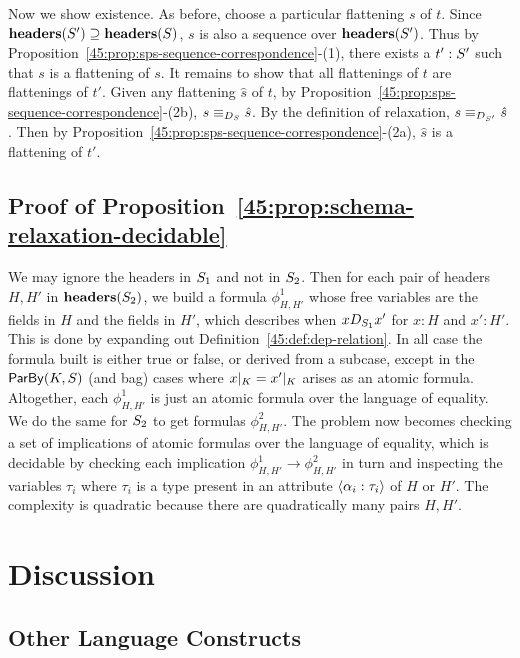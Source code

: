 Now we show existence.
As before, choose a particular flattening $s$ of $t$.
Since $\headers(\ss') \supseteq \headers(\ss)$,
$s$ is also a sequence over $\headers(\ss')$.
Thus by Proposition~\ref{45:prop:sps-sequence-correspondence}-(1),
there exists a $t': \ss'$ such that $s$ is a flattening
of $s$.
It remains to show that all flattenings of $t$ are flattenings of $t'$.
Given any flattening $\hat{s}$ of $t$,
by Proposition~\ref{45:prop:sps-sequence-correspondence}-(2b),
$s \equiv_{D_{\ss}} \hat{s}$.
By the definition of relaxation,
$s \equiv_{D_{\ss'}} \hat{s}$.
Then by Proposition~\ref{45:prop:sps-sequence-correspondence}-(2a),
$\hat{s}$ is a flattening of $t'$.

\subsection*{Proof of Proposition~\ref{45:prop:schema-relaxation-decidable}}

We may ignore the headers in $\ss_1$ and not in $\ss_2$.
Then for each pair of headers $H, H'$ in $\headers(\ss_2)$,
we build a formula $\phi^1_{H, H'}$ whose free variables are the fields
in $H$ and the fields in $H'$,
which describes when
$x D_{\ss_1} x'$ for $x : H$ and $x' : H'$.
This is done by expanding out Definition~\ref{45:def:dep-relation}.
In all case the formula built is either true or false, or derived
from a subcase,
except in the $\keyby{K}{S}$ (and bag) cases where
$\tuprestrict{x}{K} = \tuprestrict{x'}{K}$ arises as an atomic
formula.
Altogether, each $\phi^1_{H, H'}$ is just an atomic formula over the
language of equality.
We do the same for $\ss_2$ to get formulas $\phi^2_{H, H'}$.
The problem now becomes checking a set of implications
of atomic formulas over the language of equality, which is
decidable by checking each implication
$\phi^1_{H, H'} \to \phi^2_{H, H'}$
in turn
and inspecting the variables $\tau_i$ where $\tau_i$ is
a type present in an attribute $\hdrfield{\alpha_i}{\tau_i}$ of $H$ or $H'$.
The complexity is quadratic because there are quadratically many pairs $H, H'$.

\section{Discussion}

\subsection{Other Language Constructs}

